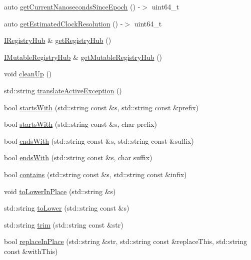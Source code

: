 \begin{DoxyCompactItemize}
\item 
auto \mbox{\hyperlink{namespace_catch_a98d058468488c486a9cb5c8463f3ba29}{get\+Current\+Nanoseconds\+Since\+Epoch}} () -\/$>$ uint64\+\_\+t
\item 
auto \mbox{\hyperlink{namespace_catch_ac8e1ed37624bd0d97b2c0d4ec099d31f}{get\+Estimated\+Clock\+Resolution}} () -\/$>$ uint64\+\_\+t
\item 
\mbox{\hyperlink{struct_catch_1_1_i_registry_hub}{I\+Registry\+Hub}} \& \mbox{\hyperlink{namespace_catch_ac24b072979540bfd922e7d46e899f46f}{get\+Registry\+Hub}} ()
\item 
\mbox{\hyperlink{struct_catch_1_1_i_mutable_registry_hub}{I\+Mutable\+Registry\+Hub}} \& \mbox{\hyperlink{namespace_catch_ac9ddcc6d66079add9cb2a3140b8ae51e}{get\+Mutable\+Registry\+Hub}} ()
\item 
void \mbox{\hyperlink{namespace_catch_a0f78e9afdebc6d4512d18e76fbf54b8c}{clean\+Up}} ()
\item 
std\+::string \mbox{\hyperlink{namespace_catch_adafff91485eeeeb9e9333f317cc0e3b1}{translate\+Active\+Exception}} ()
\item 
bool \mbox{\hyperlink{namespace_catch_a695f62327be0676e046291eeaae15110}{starts\+With}} (std\+::string const \&s, std\+::string const \&prefix)
\item 
bool \mbox{\hyperlink{namespace_catch_acad23751846ac23d0f379e34f5adebb1}{starts\+With}} (std\+::string const \&s, char prefix)
\item 
bool \mbox{\hyperlink{namespace_catch_ada025504f627feaf9ac68ca391515dff}{ends\+With}} (std\+::string const \&s, std\+::string const \&suffix)
\item 
bool \mbox{\hyperlink{namespace_catch_afd801a3e33fd7a8b91ded0d02747a93f}{ends\+With}} (std\+::string const \&s, char suffix)
\item 
bool \mbox{\hyperlink{namespace_catch_aa52974b0e426e7e2fbd725a900e9c36e}{contains}} (std\+::string const \&s, std\+::string const \&infix)
\item 
void \mbox{\hyperlink{namespace_catch_a0760dbe87d090a55a35414db57d272c4}{to\+Lower\+In\+Place}} (std\+::string \&s)
\item 
std\+::string \mbox{\hyperlink{namespace_catch_ac036a17412d318598ffda8e1fe7a1177}{to\+Lower}} (std\+::string const \&s)
\item 
std\+::string \mbox{\hyperlink{namespace_catch_a084108b47f37d8bfd5db51c50c7451b3}{trim}} (std\+::string const \&str)
\item 
bool \mbox{\hyperlink{namespace_catch_afe4e6770da547e43e9e4eeaa05f946ea}{replace\+In\+Place}} (std\+::string \&str, std\+::string const \&replace\+This, std\+::string const \&with\+This)

\end{DoxyCompactItemize}
